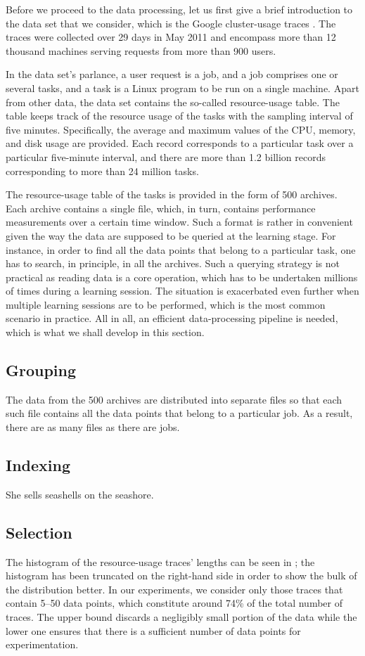 Before we proceed to the data processing, let us first give a brief introduction
to the data set that we consider, which is the Google cluster-usage traces
\cite{reiss2011}. The traces were collected over 29 days in May 2011 and
encompass more than 12 thousand machines serving requests from more than 900
users.

In the data set's parlance, a user request is a job, and a job comprises one or
several tasks, and a task is a Linux program to be run on a single machine.
Apart from other data, the data set contains the so-called resource-usage table.
The table keeps track of the resource usage of the tasks with the sampling
interval of five minutes. Specifically, the average and maximum values of the
CPU, memory, and disk usage are provided. Each record corresponds to a
particular task over a particular five-minute interval, and there are more than
1.2 billion records corresponding to more than 24 million tasks.

The resource-usage table of the tasks is provided in the form of 500 archives.
Each archive contains a single  file, which, in turn, contains
performance measurements over a certain time window. Such a format is rather in
convenient given the way the data are supposed to be queried at the learning
stage. For instance, in order to find all the data points that belong to a
particular task, one has to search, in principle, in all the archives. Such a
querying strategy is not practical as reading data is a core operation, which
has to be undertaken millions of times during a learning session. The situation
is exacerbated even further when multiple learning sessions are to be performed,
which is the most common scenario in practice. All in all, an efficient
data-processing pipeline is needed, which is what we shall develop in this
section.

\subsection{Grouping}
The  data from the 500 archives are distributed into separate 
files so that each such file contains all the data points that belong to a
particular job. As a result, there are as many  files as there are jobs.

\subsection{Indexing}
She sells seashells on the seashore.

\subsection{Selection}

The histogram of the resource-usage traces' lengths can be seen in
; the histogram has been truncated on the right-hand side in
order to show the bulk of the distribution better. In our experiments, we
consider only those traces that contain 5--50 data points, which constitute
around 74\% of the total number of traces. The upper bound discards a negligibly
small portion of the data while the lower one ensures that there is a sufficient
number of data points for experimentation.

